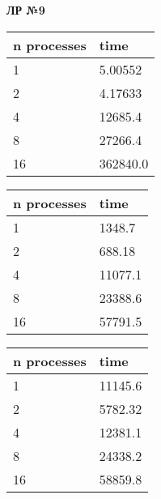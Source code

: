 \documentclass[12pt]{article}
\begin{document}
\textbf{ЛР №9}

\begin{table*}[!ht]
	\begin{minipage}{.49\linewidth}
		\centering
		\caption*{Область 8x8x8, точность $1e^{-10}$}
		\begin{tabularx}{\linewidth}{|X|X|}
			\hline
			n processes & time     \\
			\hline
			1           & 5.00552  \\
			2           & 4.17633  \\
			4           & 12685.4  \\
			8           & 27266.4  \\
			16          & 362840.0 \\
			\hline
		\end{tabularx}
	\end{minipage}%
	\begin{minipage}{.49\linewidth}
		\centering
		\caption*{Область 64x64x64, точность $1e^{-2}$}
		\begin{tabularx}{\linewidth}{|X|X|}
			\hline
			n processes & time    \\
			\hline
			1           & 1348.7  \\
			2           & 688.18  \\
			4           & 11077.1 \\
			8           & 23388.6 \\
			16          & 57791.5 \\
			\hline
		\end{tabularx}
	\end{minipage}

	\centering

	\begin{minipage}{.49\linewidth}
		\centering
		\caption*{Область 128x128x128, точность $1e^{-2}$}
		\begin{tabularx}{\linewidth}{|X|X|}
			\hline
			n processes & time    \\
			\hline
			1           & 11145.6 \\
			2           & 5782.32 \\
			4           & 12381.1 \\
			8           & 24338.2 \\
			16          & 58859.8 \\
			\hline
		\end{tabularx}
	\end{minipage}%
\end{table*}
\end{document}
